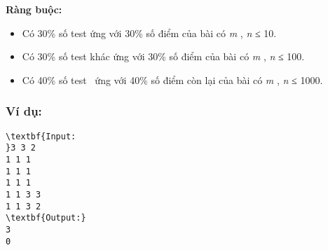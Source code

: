 \textbf{Ràng buộc: }
\begin{itemize}
	\item Có 30\% số test ứng với 30\% số điểm của bài có \emph{ m } , \emph{ n } ≤ 10.
	\item Có 30\% số test khác ứng với 30\% số điểm của bài có \emph{ m } , \emph{ n } ≤ 100.
	\item Có 40\% số test  ứng với 40\% số điểm còn lại của bài có \emph{ m } , \emph{ n } ≤ 1000.
\end{itemize}

\subsubsection{Ví dụ:}
\begin{verbatim}
\textbf{Input:
}3 3 2
1 1 1
1 1 1
1 1 1
1 1 3 3
1 1 3 2
\textbf{Output:}
3
0
\end{verbatim}